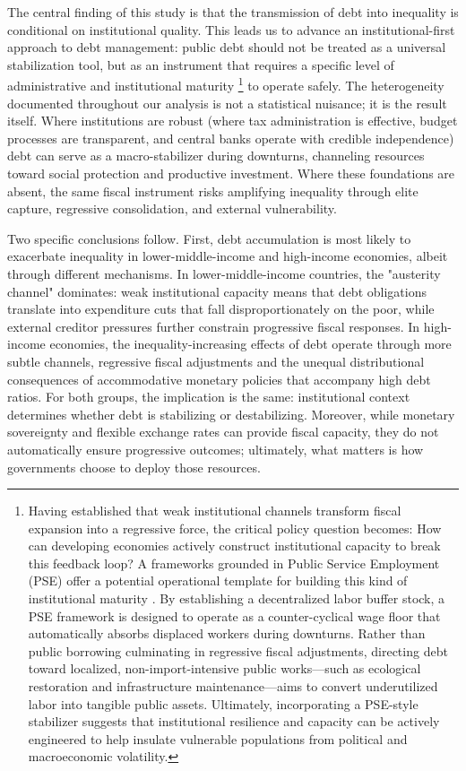 \documentclass[12pt, titlepage]{article}
\numberwithin{equation}{section}
\begin{document}
	The central finding of this study is that the transmission of debt into inequality is conditional on institutional quality. This leads us to advance an institutional-first approach to debt management: public debt should not be treated as a universal stabilization tool, but as an instrument that requires a specific level of administrative and institutional maturity \footnote{Having established that weak institutional channels transform fiscal expansion into a regressive force, the critical policy question becomes: How can developing economies actively construct institutional capacity to break this feedback loop? A frameworks grounded in Public Service Employment (PSE) offer a potential operational template for building this kind of institutional maturity \cite{Forstater2006}. By establishing a decentralized labor buffer stock, a PSE framework is designed to operate as a counter-cyclical wage floor that automatically absorbs displaced workers during downturns. Rather than public borrowing culminating in regressive fiscal adjustments, directing debt toward localized, non-import-intensive public works—such as ecological restoration and infrastructure maintenance—aims to convert underutilized labor into tangible public assets. Ultimately, incorporating a PSE-style stabilizer suggests that institutional resilience and capacity can be actively engineered to help insulate vulnerable populations from political and macroeconomic volatility.} to operate safely. The heterogeneity documented throughout our analysis is not a statistical nuisance; it is the result itself. Where institutions are robust (where tax administration is effective, budget processes are transparent, and central banks operate with credible independence) debt can serve as a macro-stabilizer during downturns, channeling resources toward social protection and productive investment. Where these foundations are absent, the same fiscal instrument risks amplifying inequality through elite capture, regressive consolidation, and external vulnerability.

	Two specific conclusions follow. First, debt accumulation is most likely to exacerbate inequality in lower-middle-income and high-income economies, albeit through different mechanisms. In lower-middle-income countries, the "austerity channel" dominates: weak institutional capacity means that debt obligations translate into expenditure cuts that fall disproportionately on the poor, while external creditor pressures further constrain progressive fiscal responses. In high-income economies, the inequality-increasing effects of debt operate through more subtle channels, regressive fiscal adjustments and the unequal distributional consequences of accommodative monetary policies that accompany high debt ratios. For both groups, the implication is the same: institutional context determines whether debt is stabilizing or destabilizing. Moreover, while monetary sovereignty and flexible exchange rates can provide fiscal capacity, they do not automatically ensure progressive outcomes; ultimately, what matters is how governments choose to deploy those resources.
\end{document}
